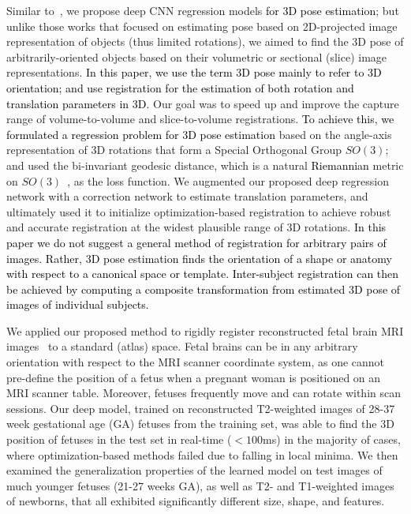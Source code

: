 \documentclass[journal,transmag]{IEEEtran}
\begin{document}
Similar to~\cite{miao2016real,miao2016cnn,mahendran20173d}, we propose deep CNN regression models \textcolor{black}{for 3D pose estimation}; but unlike those works that focused on estimating pose based on 2D-projected image representation of objects (thus limited rotations), we aimed to find the 3D pose of arbitrarily-oriented objects based on their volumetric or sectional (slice) image representations. \textcolor{black}{In this paper, we use the term 3D pose mainly to refer to 3D orientation; and use registration for the estimation of both rotation and translation parameters in 3D.} Our goal was to speed up and improve the capture range of volume-to-volume and slice-to-volume registrations. \textcolor{black}{To achieve this, we formulated a regression problem for 3D pose estimation} based on the angle-axis representation of 3D rotations that form a Special Orthogonal Group $SO(3)$; and used the bi-invariant geodesic distance, which is a natural \textcolor{black}{Riemannian} metric on $SO(3)$~\cite{huynh2009metrics}, as the loss function. We augmented our proposed deep regression network with a correction network to estimate translation parameters, and ultimately used it to initialize optimization-based registration to achieve robust and accurate registration at the widest plausible range of 3D rotations. \textcolor{black}{In this paper we do not suggest a general method of registration for arbitrary pairs of images. Rather, 3D pose estimation finds the orientation of a shape or anatomy with respect to a canonical space or template. Inter-subject registration can then be achieved by computing a composite transformation from estimated 3D pose of images of individual subjects.}

We applied our proposed method to rigidly register reconstructed fetal brain MRI images~\cite{gholipour2010robust} to a standard (atlas) space. Fetal brains can be in any arbitrary orientation with respect to the MRI scanner coordinate system, as one cannot pre-define the position of a fetus when a pregnant woman is positioned on an MRI scanner table. Moreover, fetuses frequently move and can rotate within scan sessions. Our deep model, trained on reconstructed T2-weighted images of 28-37 week gestational age (GA) fetuses from the training set, was able to find the 3D position of fetuses in the test set in real-time ($<100$ms) in the majority of cases, where optimization-based methods failed due to falling in local minima. We then examined the generalization properties of the learned model on test images of much younger fetuses (21-27 weeks GA), as well as T2- and T1-weighted images of newborns, that all exhibited significantly different size, shape, and features.
\end{document}
